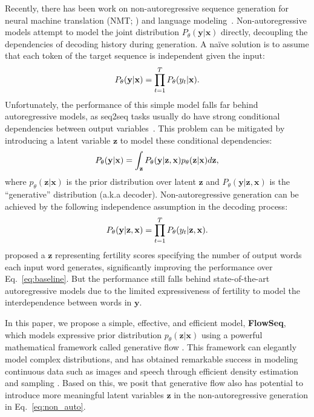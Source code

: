 \documentclass[11pt,a4paper]{article}
\newcommand{\xv}{\mathbf{x}}
\newcommand{\yv}{\mathbf{y}}
\newcommand{\zv}{\mathbf{z}}
\begin{document}
Recently, there has been work on non-autoregressive sequence generation for neural machine translation (NMT; \citet{gu2018non,lee2018deterministic,constant2019}) and language modeling~\citep{ziegler2019latent}.
Non-autoregressive models attempt to model the joint distribution $P_\theta(\mathbf{y}|\mathbf{x})$ directly, decoupling the dependencies of decoding history during generation.
A na\"ive solution is to assume that each token of the target sequence is independent given the input:
\begin{equation}\label{eq:baseline}
P_\theta(\yv|\xv) = \prod\limits_{t=1}^{T} P_\theta(y_{t} | \mathbf{x}).
\vspace{-1mm}
\end{equation}
Unfortunately, the performance of this simple model falls far behind autoregressive models, as seq2seq tasks usually do have strong conditional dependencies between output variables~\citep{gu2018non}. This problem can be mitigated by introducing a latent variable $\zv$ to model these conditional dependencies:
\begin{equation}\label{eq:non_auto}
P_{\theta}(\yv| \mathbf{x}) = \int_{\zv} P_{\theta}(\mathbf{y}|\zv, \mathbf{x}) p_{\theta}(\zv|\mathbf{x}) d\zv,
\vspace{-2mm}
\end{equation}
where $p_{\theta}(\zv|\mathbf{x})$ is the prior distribution over latent $\zv$ and $P_{\theta}(\yv|\zv, \xv)$ is the ``generative'' distribution (a.k.a decoder).
Non-autoregressive generation can be achieved by the following independence assumption in the decoding process:
\begin{equation}\label{eq:decoding}
P_{\theta}(\yv|\zv, \mathbf{x}) = \prod\limits_{t=1}^{T} P_\theta(y_{t} | \zv, \mathbf{x}).
\vspace{-2mm}
\end{equation}
\citet{gu2018non} proposed a $\zv$ representing fertility scores specifying the number of output words each input word generates, significantly improving the performance over Eq.~\eqref{eq:baseline}. 
But the performance still falls behind state-of-the-art autoregressive models due to the limited expressiveness of fertility to model the interdependence between words in $\textbf{y}$.

In this paper, we propose a simple, effective, and efficient model, \textbf{FlowSeq}, which models expressive prior distribution $p_{\theta}(\zv|\mathbf{x})$ using a powerful mathematical framework called generative flow \cite{rezende2015variational}.
This framework can elegantly model complex distributions, and has obtained remarkable success in modeling continuous data such as images and speech through efficient density estimation and sampling \cite{kingma2018glow,prenger2019waveglow,ma2019macow}.
Based on this, we posit that generative flow also has potential to introduce more meaningful latent variables $\zv$ in the non-autoregressive generation in Eq.~\eqref{eq:non_auto}.
\end{document}

